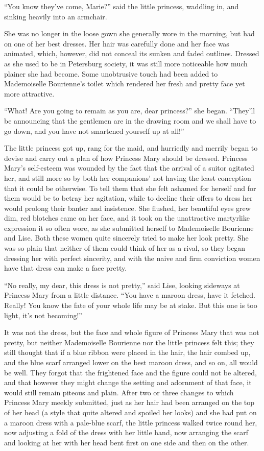 ``You know they've come, Marie?'' said the little princess,
waddling in, and sinking heavily into an armchair.

She was no longer in the loose gown she generally wore in the
morning, but had on one of her best dresses. Her hair was
carefully done and her face was animated, which, however, did not
conceal its sunken and faded outlines. Dressed as she used to be
in Petersburg society, it was still more noticeable how much
plainer she had become. Some unobtrusive touch had been added to
Mademoiselle Bourienne's toilet which rendered her fresh and
pretty face yet more attractive.

``What! Are you going to remain as you are, dear princess?'' she
began.  ``They'll be announcing that the gentlemen are in the
drawing room and we shall have to go down, and you have not
smartened yourself up at all!''

The little princess got up, rang for the maid, and hurriedly and
merrily began to devise and carry out a plan of how Princess Mary
should be dressed. Princess Mary's self-esteem was wounded by the
fact that the arrival of a suitor agitated her, and still more so
by both her companions' not having the least conception that it
could be otherwise.  To tell them that she felt ashamed for
herself and for them would be to betray her agitation, while to
decline their offers to dress her would prolong their banter and
insistence. She flushed, her beautiful eyes grew dim, red
blotches came on her face, and it took on the unattractive
martyrlike expression it so often wore, as she submitted herself
to Mademoiselle Bourienne and Lise. Both these women quite
sincerely tried to make her look pretty. She was so plain that
neither of them could think of her as a rival, so they began
dressing her with perfect sincerity, and with the naive and firm
conviction women have that dress can make a face pretty.

``No really, my dear, this dress is not pretty,'' said Lise,
looking sideways at Princess Mary from a little distance. ``You
have a maroon dress, have it fetched. Really! You know the fate
of your whole life may be at stake. But this one is too light,
it's not becoming!''

It was not the dress, but the face and whole figure of Princess
Mary that was not pretty, but neither Mademoiselle Bourienne nor
the little princess felt this; they still thought that if a blue
ribbon were placed in the hair, the hair combed up, and the blue
scarf arranged lower on the best maroon dress, and so on, all
would be well. They forgot that the frightened face and the
figure could not be altered, and that however they might change
the setting and adornment of that face, it would still remain
piteous and plain. After two or three changes to which Princess
Mary meekly submitted, just as her hair had been arranged on the
top of her head (a style that quite altered and spoiled her
looks) and she had put on a maroon dress with a pale-blue scarf,
the little princess walked twice round her, now adjusting a fold
of the dress with her little hand, now arranging the scarf and
looking at her with her head bent first on one side and then on
the other.

